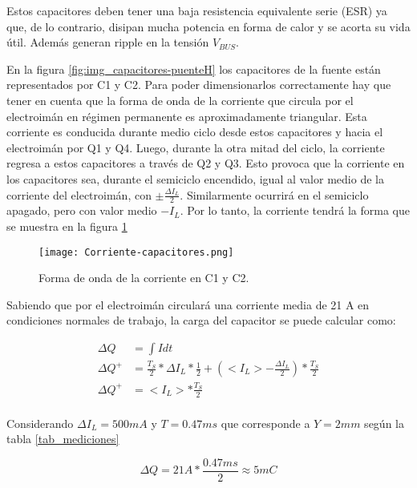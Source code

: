 \noindent Estos capacitores deben tener una baja resistencia equivalente serie (ESR) ya que, de lo contrario, disipan mucha potencia en forma de calor y se acorta su vida útil. Además generan ripple en la tensión $V_{BUS}$.

\noindent En la figura \ref{fig:img_capacitores-puenteH} los capacitores de la fuente están representados por C1 y C2. Para poder dimensionarlos correctamente hay que tener en cuenta que la forma de onda de la corriente que circula por el electroimán en régimen permanente es aproximadamente triangular. Esta corriente es conducida durante medio ciclo desde estos capacitores y hacia el electroimán por Q1 y Q4. Luego, durante la otra mitad del ciclo, la corriente regresa a estos capacitores a través de Q2 y Q3. Esto provoca que la corriente en los capacitores sea, durante el semiciclo encendido, igual al valor medio de la corriente del electroimán, con $ \pm \frac{\Delta I_L}{2}$. Similarmente ocurrirá en el semiciclo apagado, pero con valor medio $-I_L$.  Por lo tanto,  la corriente tendrá la forma que se muestra en la figura \ref{fig:img_ccorriente-capacitores}

\begin{figure}[H]
	\centering
	\texttt{[image: Corriente-capacitores.png]}
	\caption{Forma de onda de la corriente en C1 y C2.}
	\label{fig:img_ccorriente-capacitores}
\end{figure}

\noindent Sabiendo que por el electroimán circulará una corriente media de 21 A en condiciones normales de trabajo, la carga del capacitor se puede calcular como:

\begin{equation} 
	\begin{aligned}
   	\Delta Q &= \int I dt\\	
	\Delta Q ^+ &= \frac{T_S}{2}*\Delta I_L * \frac{1}{2} + (<I_L> -\frac{\Delta I_L}{2})*\frac{T_S}{2}\\
	\Delta Q ^+ &= <I_L> *\frac{T_S}{2}\\
	\end{aligned}
\end{equation}

\noindent Considerando  $\Delta I_L=500 mA$ y $T=0.47ms$ que corresponde a $Y = 2 mm$ según la tabla \ref{tab_mediciones}

\begin{equation} 
\Delta Q = 21A * \frac{0.47ms}{2} \approx 5mC
\end{equation}

